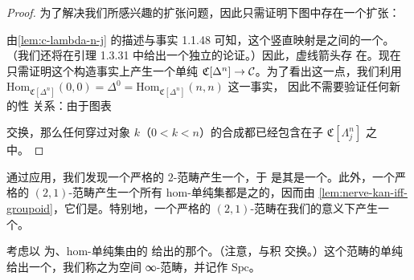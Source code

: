 \begin{proof}
为了解决我们所感兴趣的扩张问题，因此只需证明下图中存在一个扩张：
\begin{center}
\end{center}
由\cref{lem:c-lambda-n-j} 的描述与事实 1.1.48 可知，这个竖直映射是\trSimplicialSet{}之间的一个\trAnodyneMap{}。
（我们还将在引理 1.3.31 中给出一个独立的论证。）因此，虚线箭头存
在。现在只需证明这个构造事实上产生一个单纯\trFunctor{}%
$\mathfrak{C}[\Delta^n] \to \mathcal{C}$。为了看出这一点，我们利用
$\mathrm{Hom}_{\mathfrak{C}[\Delta^n]}(0, 0) = \Delta^0 = \mathrm{Hom}_{\mathfrak{C}[\Delta^n]}(n, n)$ 这一事实，
因此不需要验证任何新的\trFunctor{}性
关系：由于图表
\begin{center}
\end{center}
交换，那么任何穿过对象 $k$（$0 < k < n$）的合成都已经包含在子\trSimplicialCategory{}%
$\mathfrak{C}[\Lambda^n_j]$ 之中。
\end{proof}

\begin{observation}\label{obs:strict-2-category}
通过应用\trNerve{}，我们发现一个严格的 $2$-范畴产生一个\trSimplicialCategory{}，于
是其\trCoherentNerve{}是一个\trComposer{}。此外，一个严格的 $(2, 1)$-范畴产生一个所有
hom-单纯集都是\trGroupoid{}之\trNerve{}的\trSimplicialCategory{}，因而由%
\cref{lem:nerve-kan-iff-groupoid}，它们是\trKanComplex{}。特别地，一个严格的
$(2, 1)$-范畴在我们的意义下产生一个\trInfinityCategory{}。
\end{observation}

\begin{definition}\label{def:infinity-category-spaces}
考虑以 \trCWComplex{}为\trObject{}、hom-单纯集由\trMappingSpace{}的%
\trSingularSimplicialSet{}给出的那个\trSimplicialCategory{}。（注意，\trSingularSimplicialSet{}与积
交换。）这个范畴的单纯\trNerve{}给出一个\trInfinityCategory{}，我们称之为空间
∞-范畴，并记作 $\mathrm{Spc}$。
\end{definition}

